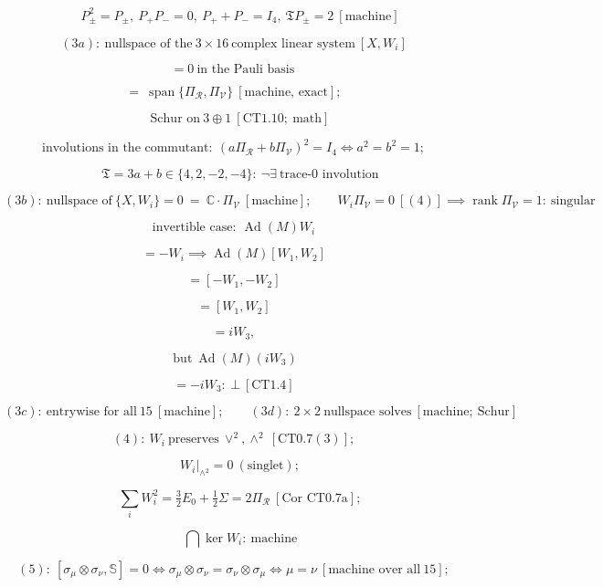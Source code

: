 \begin{theorem}
\[
\quad P_\pm^2=P_\pm,\ P_+P_-=0,\ P_++P_-=I_4,\ \mathfrak T P_\pm=2\ [\text{machine}]
\]

\[
(3a):\ \text{nullspace of the}\ 3\times16\ \text{complex linear system}\ [X,W_i]
\]

\[
= 0\ \text{in the Pauli basis}\
\]

\[
= \ \operatorname{span}\{\Pi_{\mathcal R},\Pi_{\mathcal V}\}\ [\text{machine, exact}];
\]

\[
\quad \text{Schur on}\ 3\oplus1\ [\mathrm{CT1.10};\ \text{math}]
\]

\[
\text{involutions in the commutant}:\ (a\Pi_{\mathcal R}+b\Pi_{\mathcal V})^2=I_4\iff a^2=b^2=1;
\]

\[
\quad \mathfrak T=3a+b\in\{4,2,-2,-4\}:\ \neg\exists\ \text{trace-0 involution}
\]

\[
(3b):\ \text{nullspace of}\ \{X,W_i\}=0\ =\ \mathbb C\cdot\Pi_{\mathcal V}\ [\text{machine}];\qquad W_i\Pi_{\mathcal V}=0\ [(4)]\implies\operatorname{rank}\Pi_{\mathcal V}=1:\ \text{singular}
\]

\[
\text{invertible case}:\ \operatorname{Ad}(M)W_i
\]

\[
= -W_i\implies\operatorname{Ad}(M)[W_1,W_2]
\]

\[
= [-W_1,-W_2]
\]

\[
= [W_1,W_2]
\]

\[
= iW_3,
\]

\[
\ \text{but}\ \operatorname{Ad}(M)(iW_3)
\]

\[
= -iW_3:\ \bot\ [\mathrm{CT1.4}]
\]

\[
(3c):\ \text{entrywise for all}\ 15\ [\text{machine}];\qquad (3d):\ 2\times2\ \text{nullspace solves}\ [\text{machine};\ \text{Schur}]
\]

\[
(4):\ W_i\ \text{preserves}\ \vee^2,\wedge^2\ [\mathrm{CT0.7}(3)];
\]

\[
\quad W_i|_{\wedge^2}=0\ (\text{singlet});
\]

\[
\quad \sum_iW_i^2=\tfrac32E_0+\tfrac12\Sigma=2\Pi_{\mathcal R}\ [\text{Cor CT0.7a}];
\]

\[
\quad \bigcap\ker W_i:\ \text{machine}
\]

\[
(5):\ [\sigma_\mu\otimes\sigma_\nu,\mathbb S]=0\iff\sigma_\mu\otimes\sigma_\nu=\sigma_\nu\otimes\sigma_\mu\iff\mu=\nu\ [\text{machine over all}\ 15];
\]


\end{theorem}

